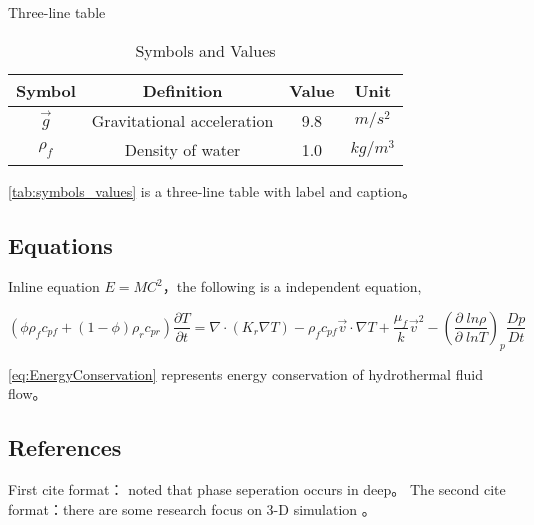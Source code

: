 Three-line table

\begin{table}[htbp]
	\centering
	\caption{Symbols and Values}
	\label{tab:symbols_values}
	\begin{tabular}{cccc}
		\toprule 
		Symbol & Definition & Value &Unit \\
		\midrule
		$\vec{g}$ & Gravitational acceleration & 9.8 & $m/s^2$ \\
		$\rho_f$ & Density of water & 1.0 & $kg/m^3$ \\
		\bottomrule
	\end{tabular}
\end{table}

\autoref{tab:symbols_values} is a three-line table with label and caption。

\subsection{Equations}

Inline equation $E=MC^2$，the following is a independent equation,

\begin{equation}
\left( {\phi {\rho _f}{c_{pf}} + \left( {1 - \phi } \right){\rho _r}{c_{pr}}} \right)\frac{{\partial T}}{{\partial t}} = \nabla  \cdot \left( {{K_r}\nabla T} \right) - {\rho _f}{c_{pf}}\vec v \cdot \nabla T + \frac{{{\mu _f}}}{k}{\vec v^2} - {\left( {\frac{{\partial \;ln\rho }}{{\partial \;lnT}}} \right)_p}\frac{{Dp}}{{Dt}}
\label{eq:EnergyConservation}
\end{equation}

 \ref{eq:EnergyConservation} represents energy conservation of hydrothermal fluid flow。

\subsection{References}
First cite format：\cite{vehling2018implementation} noted that phase seperation occurs in deep。
The second cite format：there are some research focus on 3-D simulation \citep{coumou2008structure,coumou2006dynamics}。
